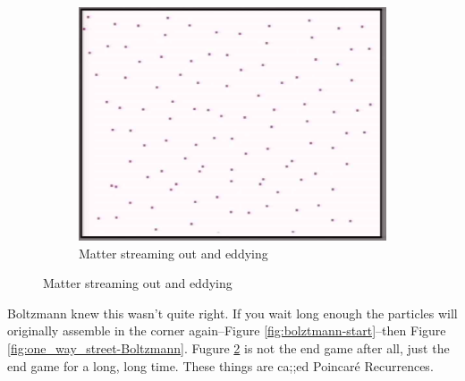 \documentclass[]{article}
\begin{document}
\begin{figure}[H]
\begin{center}
		\begin{subfigure}[b]{0.3\textwidth}
			\caption{Matter streaming out and eddying}\label{fig:end-game-thermal-equilibrium}
			\includegraphics[width=\textwidth]{end-game-thermal-equilibrium}
		\end{subfigure}
	\end{center}
\end{figure}

Boltzmann knew this wasn't quite right. If you wait long enough the particles will originally assemble in the corner again--Figure \ref{fig:bolztmann-start}--then Figure \ref{fig:one_way_street-Boltzmann}. Fugure \ref{fig:end-game-thermal-equilibrium} is not the end game after all, just the end game for a long, long time. These things are ca;;ed Poincar\'e Recurrences. 


\raggedright

\end{document}
